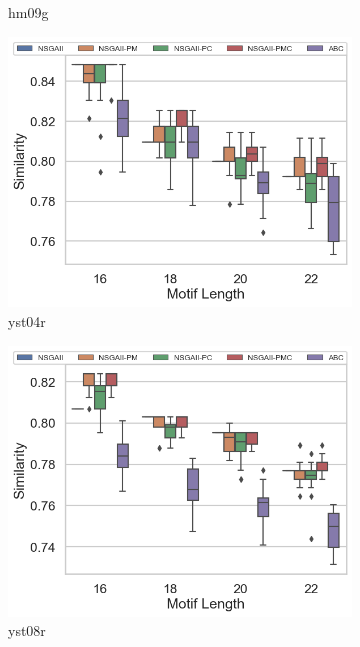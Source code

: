 \begin{figure}[!htbp]
\begin{adjustwidth}{-1cm}{-1cm}
\begin{subfigure}[b]{0.4\textwidth}
			\caption{hm09g}
		\end{subfigure}%
		\begin{subfigure}[b]{0.4\textwidth}
			\includegraphics[width=\textwidth]{Figure/yst04r_all_boxplot}
			\caption{yst04r}
		\end{subfigure}    
		\begin{subfigure}[b]{0.4\textwidth}
			\includegraphics[width=\textwidth]{Figure/yst08r_all_boxplot}
			\caption{yst08r}
		\end{subfigure}%
		\begin{subfigure}[b]{0.4\textwidth}

\end{subfigure}
\end{adjustwidth}
\end{figure}
